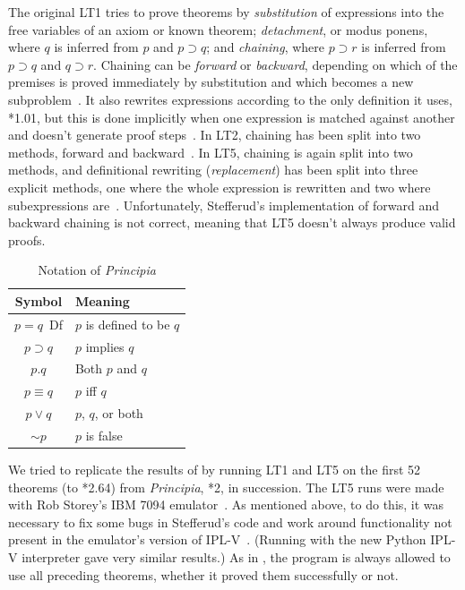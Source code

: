 \documentclass[journal]{IEEEtran}
\begin{document}
The original LT1 tries to prove theorems by {\em substitution}
of expressions into the free variables of an axiom or known
theorem; {\em detachment}, or modus ponens, where $q$ is inferred
from $p$ and $p\supset q$; and {\em chaining}, where $p\supset r$
is inferred from $p\supset q$ and $q\supset r$.  Chaining can
be {\em forward} or {\em backward}, depending on which of the
premises is proved immediately by substitution and which becomes
a new subproblem~\cite[pp.~29--45]{LT1956b}.
It also rewrites expressions according to the only definition
it uses, *1.01, but this is done implicitly when one expression
is matched against another and doesn't generate proof 
steps~\cite[p.~34]{LT1956b}.
In LT2, chaining has been split into two methods, forward
and backward~\cite[p.~222]{LT1957}.
In LT5, chaining is again split into two methods,
and definitional rewriting ({\em replacement})
has been split into three explicit methods, one where the whole
expression is rewritten and two where subexpressions 
are~\cite[Section~III]{stefferud1963lt}.
Unfortunately, Stefferud's implementation of forward and
backward chaining is not correct, meaning that LT5 doesn't
always produce valid proofs.

\begin{table}[h]
\centering
\caption{Notation of \textit{Principia}}
\label{tab:notation}
\begin{tabular}{cl}
\toprule
\textbf{Symbol} & \textbf{Meaning} \\
\midrule
$p=q$\ {\rm Df} & $p$ is defined to be $q$ \\
$p\supset q$ & $p$ implies $q$ \\
$p.q$ & Both $p$ and $q$ \\
$p\equiv q$ & $p$ iff $q$ \\
$p\vee q$ & $p$, $q$, or both \\
$\sim p$ & $p$ is false  \\
\bottomrule
\end{tabular}
\end{table}

We tried to replicate the results of \cite{LT1957}
by running LT1 and LT5 on the first 52 theorems (to *2.64)
from {\em Principia}, *2, in 
succession.  The LT5 runs were made with Rob Storey's
IBM 7094 emulator~\cite{ibsys}.  As mentioned above,
to do this, it was
necessary to fix some bugs in Stefferud's code and work 
around functionality not present in the emulator's version
of IPL-V~\cite{moewsrepo2}.  (Running with the new Python
IPL-V interpreter gave very similar results.)
As in \cite{LT1957}, 
the program is always allowed to use
all preceding theorems, whether it proved them successfully
or not.  
\end{document}

